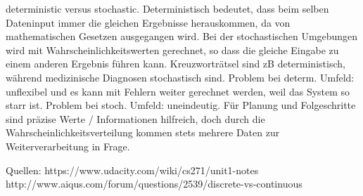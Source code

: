 \documentclass[10pt,a4paper]{article}
\begin{document}
deterministic versus stochastic. 
Deterministisch bedeutet, dass beim selben Dateninput immer die gleichen Ergebnisse herauskommen, da von mathematischen Gesetzen ausgegangen wird.
Bei der stochastischen Umgebungen wird mit Wahrscheinlichkeitswerten gerechnet, so dass die gleiche Eingabe zu einem anderen Ergebnis führen kann.
Kreuzworträtsel sind zB deterministisch, während medizinische Diagnosen stochastisch sind. Problem bei determ. Umfeld: unflexibel und es kann mit Fehlern weiter gerechnet werden, weil das System so starr ist. Problem bei stoch. Umfeld: uneindeutig. Für Planung und Folgeschritte sind präzise Werte / Informationen hilfreich, doch durch die Wahrscheinlichkeitsverteilung kommen stets mehrere Daten zur Weiterverarbeitung in Frage.

Quellen: https://www.udacity.com/wiki/cs271/unit1-notes
http://www.aiqus.com/forum/questions/2539/discrete-vs-continuous
		
\end{document}
